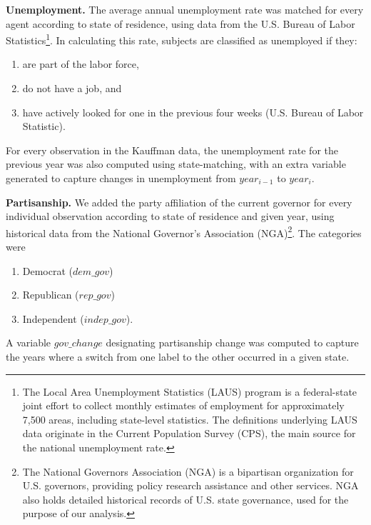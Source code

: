 \textbf{Unemployment.} The average annual unemployment rate was matched for every agent according to state of residence, using data from the U.S. Bureau of Labor Statistics\footnote{The Local Area Unemployment Statistics (LAUS) program is a federal-state joint effort to collect monthly estimates of employment for approximately 7,500 areas, including state-level statistics. The definitions underlying LAUS data originate in the Current Population Survey (CPS),  the main source for the national unemployment rate. 
}. In calculating this rate, subjects are classified as unemployed if they:
\renewcommand{\labelenumi}{\roman{enumi}}
\begin{enumerate}
    \singlespacing
    \item are part of the labor force,
    \item do not have a job, and
    \item have actively looked for one in the previous four weeks (U.S. Bureau of Labor Statistic). 
    
\end{enumerate}


For every observation in the Kauffman data, the unemployment rate for the previous year was also computed using state-matching, with an extra variable generated to capture changes in unemployment from $year_{i-1}$ to $year_{i}$. 

\textbf{Partisanship.} We added the party affiliation of the current governor for every individual observation according to state of residence and given year, using historical data from the National Governor's Association (NGA)\footnote{The National Governors Association (NGA) is a bipartisan organization for U.S. governors, providing policy research assistance and other services. NGA also holds detailed historical records of U.S. state governance, used for the purpose of our analysis.}. The categories were 

\renewcommand{\labelenumi}{\roman{enumi}}
\begin{enumerate}
\singlespacing
\item Democrat ($dem\_gov$)
\item Republican ($rep\_gov$)  
\item Independent ($indep\_gov$).
\end{enumerate}

A variable $gov\_change$ designating partisanship change was computed to capture the years where a switch from one label to the other occurred in a given state. 

